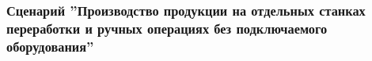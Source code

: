 \subsubsection{Сценарий ''Производство продукции на отдельных станках переработки и ручных операциях без подключаемого оборудования''}
\label{bp:production_21}

